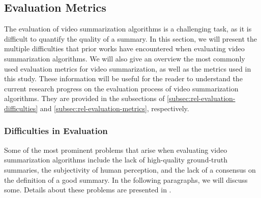 
\subsection{Evaluation Metrics}
\label{subsec:rel-evaluation}

	The evaluation of video summarization algorithms is a challenging task, as it is difficult to quantify the quality of a summary. In this section, we will present the multiple difficulties that prior works have encountered when evaluating video summarization algorithms. We will also give an overview the most commonly used evaluation metrics for video summarization, as well as the metrics used in this study. These information will be useful for the reader to understand the current research progress on the evaluation process of video summarization algorithms. They are provided in the subsections of \ref{subsec:rel-evaluation-difficulties} and \ref{subsec:rel-evaluation-metrics}, respectively.
	
	\subsubsection{Difficulties in Evaluation}
	\label{subsubsec:rel-evaluation-difficulties}
		Some of the most prominent problems that arise when evaluating video summarization algorithms include the lack of high-quality ground-truth summaries, the subjectivity of human perception, and the lack of a consensus on the definition of a good summary. In the following paragraphs, we will discuss some. Details about these problems are presented in \cite{Apostolidis2021Video}.

